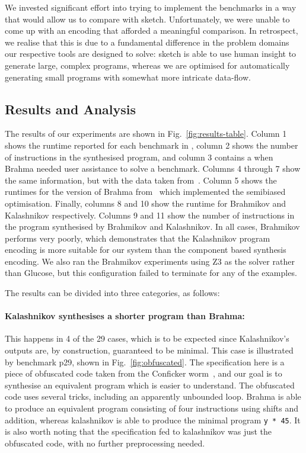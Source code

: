 \documentclass[a4paper]{llncs}
\newcommand{\xmark}{\ding{55}}
\begin{document}
We invested significant effort into trying to implement the benchmarks in a way
that would allow us to compare with {\sc sketch}. Unfortunately, we were unable to come up
with an encoding that afforded a meaningful comparison.  In retrospect,
we realise that this is due to a fundamental difference in the problem domains
our respective tools are designed to solve: {\sc sketch} is able to use
human insight to generate large, complex programs, whereas we are optimised for 
automatically generating small programs with somewhat more intricate data-flow.


\subsection{Results and Analysis}
The results of our experiments are shown in Fig.~\ref{fig:results-table}.
Column 1 shows the runtime reported for each benchmark in \cite{brahma}, column 2
shows the number of instructions in the synthesised program, and column 3 contains a \xmark\;when
{\sc Brahma} needed user assistance to solve a benchmark.
Columns 4 through 7 show the same information, but with the data taken from~\cite{brahma-icse}.
Column 5 shows the runtimes for the version of {\sc Brahma} from~\cite{brahma-icse} which
implemented the semibiased optimisation.
Finally, columns 8 and 10 show the runtime for {\sc Brahmikov} and {\sc Kalashnikov} respectively.
Columns 9 and 11 show the number of instructions
in the program synthesised by {\sc Brahmikov} and {\sc Kalashnikov}.  In all cases,
{\sc Brahmikov} performs very poorly, which demonstrates that the {\sc Kalashnikov} program
encoding is more suitable for our system than the component based synthesis encoding.
We also ran the {\sc Brahmikov} experiments using Z3 as the solver rather than Glucose,
but this configuration failed to terminate for any of the examples.

The results can be divided into three categories, as follows:


\paragraph{\bf {\sc Kalashnikov} synthesises a shorter program than {\sc Brahma}:}
This happens in 4 of the 29 cases, which is to be expected since {\sc Kalashnikov}'s outputs
are, by construction, guaranteed to be minimal.  This case is illustrated by benchmark p29, shown in Fig.~\ref{fig:obfuscated}.
The specification here is a piece of obfuscated code taken from the Conficker worm~\cite{conficker}, and
our goal is to synthesise an equivalent program which is easier to understand.  The obfuscated code
uses several tricks, including an apparently unbounded loop.  {\sc Brahma} is able to
produce an equivalent program consisting of four instructions using shifts and addition, whereas {\sc kalashnikov}
is able to produce the minimal program \verb|y * 45|.  It is also worth noting that the specification
fed to {\sc kalashnikov} was just the obfuscated code, with no further preprocessing needed.
\end{document}
